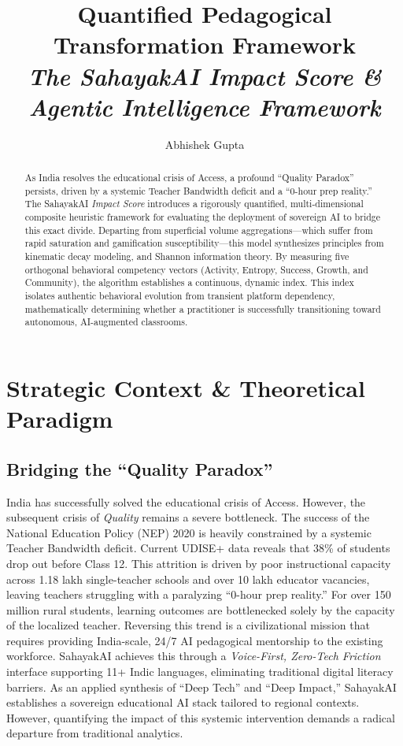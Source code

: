 \documentclass[11pt,a4paper]{article}
\title{\textbf{Quantified Pedagogical Transformation Framework}\\[0.4cm] \Large \textit{The SahayakAI Impact Score \& Agentic Intelligence Framework}}
\author[1]{Abhishek Gupta}
\affil[1]{SARGVISION Agentic Intelligence Lab}
\date{}
\begin{document}
\maketitle

\begin{abstract}
As India resolves the educational crisis of Access, a profound ``Quality Paradox'' persists, driven by a systemic Teacher Bandwidth deficit and a ``0-hour prep reality.'' The SahayakAI \textit{Impact Score} introduces a rigorously quantified, multi-dimensional composite heuristic framework for evaluating the deployment of sovereign AI to bridge this exact divide. Departing from superficial volume aggregations---which suffer from rapid saturation and gamification susceptibility---this model synthesizes principles from kinematic decay modeling, and Shannon information theory. By measuring five orthogonal behavioral competency vectors (Activity, Entropy, Success, Growth, and Community), the algorithm establishes a continuous, dynamic index. This index isolates authentic behavioral evolution from transient platform dependency, mathematically determining whether a practitioner is successfully transitioning toward autonomous, AI-augmented classrooms.
\end{abstract}

\section{Strategic Context \& Theoretical Paradigm}

\subsection{Bridging the ``Quality Paradox''}
India has successfully solved the educational crisis of Access. However, the subsequent crisis of \textit{Quality} remains a severe bottleneck. The success of the National Education Policy (NEP) 2020 is heavily constrained by a systemic Teacher Bandwidth deficit. Current UDISE+ data reveals that 38\% of students drop out before Class 12. This attrition is driven by poor instructional capacity across 1.18 lakh single-teacher schools and over 10 lakh educator vacancies, leaving teachers struggling with a paralyzing ``0-hour prep reality.'' For over 150 million rural students, learning outcomes are bottlenecked solely by the capacity of the localized teacher. Reversing this trend is a civilizational mission that requires providing India-scale, 24/7 AI pedagogical mentorship to the existing workforce. SahayakAI achieves this through a \textit{Voice-First, Zero-Tech Friction} interface supporting 11+ Indic languages, eliminating traditional digital literacy barriers. As an applied synthesis of ``Deep Tech'' and ``Deep Impact,'' SahayakAI establishes a sovereign educational AI stack tailored to regional contexts. However, quantifying the impact of this systemic intervention demands a radical departure from traditional analytics.
\end{document}
